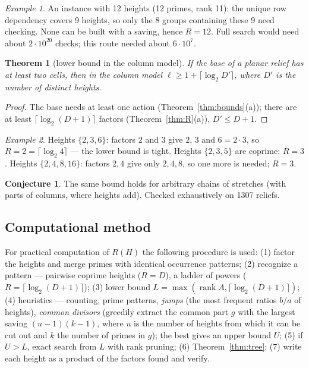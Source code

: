 \documentclass[11pt,a4paper]{article}
\theoremstyle{plain}
\newtheorem{theorem}{Theorem}[section]
\theoremstyle{definition}
\newtheorem{conjecture}{Conjecture}
\theoremstyle{remark}
\newtheorem*{example}{Example}
\begin{document}
\begin{example}
An instance with 12 heights (12 primes, rank 11): the unique row dependency covers 9 heights, so only the 8 groups containing these 9 need checking. None can be built with a saving, hence $R=12$. Full search would need about $2\cdot10^{20}$ checks; this route needed about $6\cdot10^7$.
\end{example}

\begin{theorem}[lower bound in the column model]
If the base of a planar relief has at least two cells, then in the column model $\ell\ge1+\lceil\log_2D'\rceil$, where $D'$ is the number of distinct heights.
\end{theorem}
\begin{proof}
The base needs at least one action (Theorem~\ref{thm:bounds}(a)); there are at least $\lceil\log_2(D+1)\rceil$ factors (Theorem~\ref{thm:R}(a)), $D'\le D+1$.
\end{proof}

\begin{example}
Heights $\{2,3,6\}$: factors $2$ and $3$ give $2$, $3$ and $6=2\cdot3$, so $R=2=\lceil\log_2 4\rceil$ — the lower bound is tight. Heights $\{2,3,5\}$ are coprime: $R=3$. Heights $\{2,4,8,16\}$: factors $2,4$ give only $2,4,8$, so one more is needed; $R=3$.
\end{example}

\begin{conjecture}\label{conj:relief}
The same bound holds for arbitrary chains of stretches (with parts of columns, where heights add). Checked exhaustively on 1307 reliefs.
\end{conjecture}

\subsection{Computational method}\label{sec:compute}
For practical computation of $R(H)$ the following procedure is used: (1) factor the heights and merge primes with identical occurrence patterns; (2) recognize a pattern — pairwise coprime heights ($R=D$), a ladder of powers ($R=\lceil\log_2(D+1)\rceil$); (3) lower bound $L=\max(\operatorname{rank}A,\lceil\log_2(D+1)\rceil)$; (4) heuristics — counting, prime patterns, \emph{jumps} (the most frequent ratios $b/a$ of heights), \emph{common divisors} (greedily extract the common part $g$ with the largest saving $(u-1)(k-1)$, where $u$ is the number of heights from which it can be cut out and $k$ the number of primes in $g$); the best gives an upper bound $U$; (5) if $U>L$, exact search from $L$ with rank pruning; (6) Theorem~\ref{thm:tree}; (7) write each height as a product of the factors found and verify.
\end{document}
